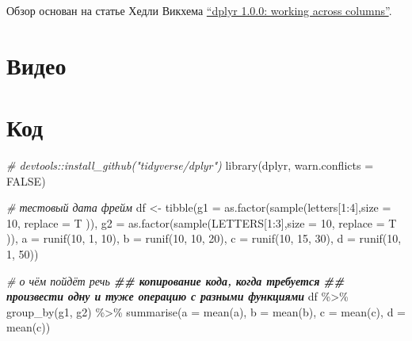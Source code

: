\documentclass[
]{book}
\newenvironment{Shaded}{\begin{snugshade}}{\end{snugshade}}
\newcommand{\AttributeTok}[1]{\textcolor[rgb]{0.77,0.63,0.00}{#1}}
\newcommand{\CommentTok}[1]{\textcolor[rgb]{0.56,0.35,0.01}{\textit{#1}}}
\newcommand{\ConstantTok}[1]{\textcolor[rgb]{0.00,0.00,0.00}{#1}}
\newcommand{\DecValTok}[1]{\textcolor[rgb]{0.00,0.00,0.81}{#1}}
\newcommand{\DocumentationTok}[1]{\textcolor[rgb]{0.56,0.35,0.01}{\textbf{\textit{#1}}}}
\newcommand{\FunctionTok}[1]{\textcolor[rgb]{0.00,0.00,0.00}{#1}}
\newcommand{\NormalTok}[1]{#1}
\newcommand{\OtherTok}[1]{\textcolor[rgb]{0.56,0.35,0.01}{#1}}
\newcommand{\SpecialCharTok}[1]{\textcolor[rgb]{0.00,0.00,0.00}{#1}}
\begin{document}
Обзор основан на статье Хедли Викхема \href{https://www.tidyverse.org/blog/2020/04/dplyr-1-0-0-colwise/}{``dplyr 1.0.0: working across columns''}.

\hypertarget{ux432ux438ux434ux435ux43e-1}{%
\section{Видео}\label{ux432ux438ux434ux435ux43e-1}}

\hypertarget{ux43aux43eux434-1}{%
\section{Код}\label{ux43aux43eux434-1}}

\begin{Shaded}
\begin{Highlighting}[]
\CommentTok{\# devtools::install\_github("tidyverse/dplyr")}
\FunctionTok{library}\NormalTok{(dplyr, }\AttributeTok{warn.conflicts =} \ConstantTok{FALSE}\NormalTok{)}

\CommentTok{\# тестовый дата фрейм}
\NormalTok{df }\OtherTok{\textless{}{-}} \FunctionTok{tibble}\NormalTok{(}\AttributeTok{g1 =} \FunctionTok{as.factor}\NormalTok{(}\FunctionTok{sample}\NormalTok{(letters[}\DecValTok{1}\SpecialCharTok{:}\DecValTok{4}\NormalTok{],}\AttributeTok{size =} \DecValTok{10}\NormalTok{, }\AttributeTok{replace =}\NormalTok{ T )),}
             \AttributeTok{g2 =} \FunctionTok{as.factor}\NormalTok{(}\FunctionTok{sample}\NormalTok{(LETTERS[}\DecValTok{1}\SpecialCharTok{:}\DecValTok{3}\NormalTok{],}\AttributeTok{size =} \DecValTok{10}\NormalTok{, }\AttributeTok{replace =}\NormalTok{ T )),}
             \AttributeTok{a  =} \FunctionTok{runif}\NormalTok{(}\DecValTok{10}\NormalTok{, }\DecValTok{1}\NormalTok{, }\DecValTok{10}\NormalTok{),}
             \AttributeTok{b  =} \FunctionTok{runif}\NormalTok{(}\DecValTok{10}\NormalTok{, }\DecValTok{10}\NormalTok{, }\DecValTok{20}\NormalTok{),}
             \AttributeTok{c  =} \FunctionTok{runif}\NormalTok{(}\DecValTok{10}\NormalTok{, }\DecValTok{15}\NormalTok{, }\DecValTok{30}\NormalTok{),}
             \AttributeTok{d  =} \FunctionTok{runif}\NormalTok{(}\DecValTok{10}\NormalTok{, }\DecValTok{1}\NormalTok{, }\DecValTok{50}\NormalTok{))}

\CommentTok{\# о чём пойдёт речь}
\DocumentationTok{\#\# копирование кода, когда требуется }
\DocumentationTok{\#\# произвести одну и туже операцию с разными функциями}
\NormalTok{df }\SpecialCharTok{\%\textgreater{}\%} 
  \FunctionTok{group\_by}\NormalTok{(g1, g2) }\SpecialCharTok{\%\textgreater{}\%} 
  \FunctionTok{summarise}\NormalTok{(}\AttributeTok{a =} \FunctionTok{mean}\NormalTok{(a), }\AttributeTok{b =} \FunctionTok{mean}\NormalTok{(b), }\AttributeTok{c =} \FunctionTok{mean}\NormalTok{(c), }\AttributeTok{d =} \FunctionTok{mean}\NormalTok{(c))}


\end{Highlighting}
\end{Shaded}
\end{document}
